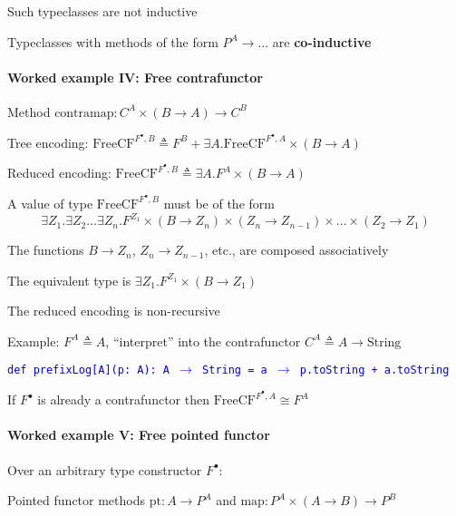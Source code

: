 Such typeclasses are not inductive

Typeclasses with methods of the form $P^{A}\rightarrow...$ are \textbf{co-inductive}


\paragraph{Worked example IV: Free contrafunctor}

Method $\text{contramap}:C^{A}\times\left(B\rightarrow A\right)\rightarrow C^{B}$ 

Tree encoding: $\text{FreeCF}^{F^{\bullet},B}\triangleq F^{B}+\exists A.\text{FreeCF}^{F^{\bullet},A}\times\left(B\rightarrow A\right)$

Reduced encoding: $\text{FreeCF}^{F^{\bullet},B}\triangleq\exists A.F^{A}\times\left(B\rightarrow A\right)$ 

A value of type $\text{FreeCF}^{F^{\bullet},B}$ must be of the form
{\footnotesize{}
\[
\exists Z_{1}.\exists Z_{2}...\exists Z_{n}.F^{Z_{1}}\times\left(B\rightarrow Z_{n}\right)\times\left(Z_{n}\rightarrow Z_{n-1}\right)\times...\times\left(Z_{2}\rightarrow Z_{1}\right)
\]
}{\footnotesize\par}

The functions $B\rightarrow Z_{n}$, $Z_{n}\rightarrow Z_{n-1}$,
etc., are composed associatively

The equivalent type is $\exists Z_{1}.F^{Z_{1}}\times\left(B\rightarrow Z_{1}\right)$

The reduced encoding is non-recursive

Example: $F^{A}\triangleq A$, \textsf{``}interpret\textsf{''} into the contrafunctor
$C^{A}\triangleq A\rightarrow\text{String}$

\texttt{\textcolor{blue}{\footnotesize{}def prefixLog{[}A{]}(p: A): A
$\rightarrow$ String = a $\rightarrow$ p.toString + a.toString}}{\footnotesize\par}

If $F^{\bullet}$ is already a contrafunctor then $\text{FreeCF}^{F^{\bullet},A}\cong F^{A}$


\paragraph{Worked example V: Free pointed functor}

Over an arbitrary type constructor $F^{\bullet}$:

Pointed functor methods {\footnotesize{}$\text{pt}:A\rightarrow P^{A}$}
and {\footnotesize{}$\text{map}:P^{A}\times\left(A\rightarrow B\right)\rightarrow P^{B}$}{\footnotesize\par}

